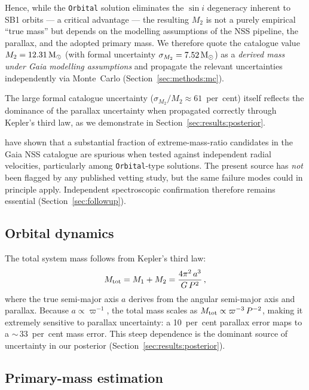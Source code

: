 \documentclass[usenatbib,fleqn]{mnras}
\newcommand{\Msun}{{\rm M}_\odot}
\begin{document}
Hence, while the \texttt{Orbital} solution eliminates the
$\sin i$ degeneracy inherent to SB1 orbits --- a critical
advantage --- the resulting $M_2$ is not a purely empirical
``true mass'' but depends on the modelling assumptions of the NSS
pipeline, the parallax, and the adopted primary mass.  We therefore
quote the catalogue value $M_2 = 12.31\,\Msun$ (with formal
uncertainty $\sigma_{M_2} = 7.52\,\Msun$) as a
\emph{derived mass under Gaia modelling assumptions} and
propagate the relevant uncertainties independently via Monte~Carlo
(Section~\ref{sec:methods:mc}).

The large formal catalogue uncertainty ($\sigma_{M_2}/M_2 \approx
61$~per~cent) itself reflects the dominance of the parallax
uncertainty when propagated correctly through Kepler's third law,
as we demonstrate in Section~\ref{sec:results:posterior}.

\citet{ElBadry2024} have shown that a substantial fraction of
extreme-mass-ratio candidates in the Gaia NSS catalogue are
spurious when tested against independent radial velocities,
particularly among \texttt{Orbital}-type solutions.  The
present source has \emph{not} been flagged by any published
vetting study, but the same failure modes could in
principle apply.  Independent spectroscopic confirmation therefore
remains essential (Section~\ref{sec:followup}).

\subsection{Orbital dynamics}
\label{sec:methods:orbit}

The total system mass follows from Kepler's third law:
\begin{equation}
M_{\rm tot} = M_1 + M_2 = \frac{4\pi^2\,a^3}{G\,P^2}\,,
\label{eq:kepler}
\end{equation}
where the true semi-major axis $a$ derives from the angular
semi-major axis and parallax.  Because
$a \propto \varpi^{-1}$, the total mass scales as
$M_{\rm tot} \propto \varpi^{-3}\,P^{-2}$, making it extremely
sensitive to parallax uncertainty: a 10~per~cent parallax error
maps to a $\sim$\,33~per~cent mass error.  This steep
dependence is the dominant source of uncertainty in our posterior
(Section~\ref{sec:results:posterior}).

\subsection{Primary-mass estimation}
\label{sec:methods:m1}
\end{document}
